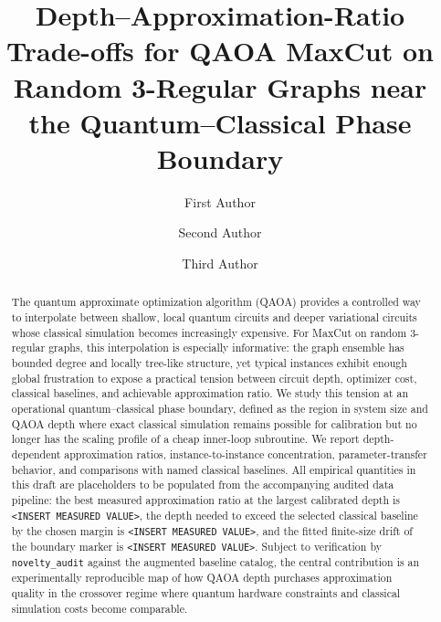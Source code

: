 \documentclass[reprint,aps,longbibliography]{revtex4-2}
\begin{document}
\title{Depth--Approximation-Ratio Trade-offs for QAOA MaxCut on Random 3-Regular Graphs near the Quantum--Classical Phase Boundary}

\author{First Author}

\author{Second Author}

\author{Third Author}

\maketitle

\begin{abstract}
The quantum approximate optimization algorithm (QAOA) provides a controlled way to interpolate between shallow, local quantum circuits and deeper variational circuits whose classical simulation becomes increasingly expensive. For MaxCut on random 3-regular graphs, this interpolation is especially informative: the graph ensemble has bounded degree and locally tree-like structure, yet typical instances exhibit enough global frustration to expose a practical tension between circuit depth, optimizer cost, classical baselines, and achievable approximation ratio. We study this tension at an operational quantum--classical phase boundary, defined as the region in system size and QAOA depth where exact classical simulation remains possible for calibration but no longer has the scaling profile of a cheap inner-loop subroutine. We report depth-dependent approximation ratios, instance-to-instance concentration, parameter-transfer behavior, and comparisons with named classical baselines. All empirical quantities in this draft are placeholders to be populated from the accompanying audited data pipeline: the best measured approximation ratio at the largest calibrated depth is \texttt{<INSERT MEASURED VALUE>}, the depth needed to exceed the selected classical baseline by the chosen margin is \texttt{<INSERT MEASURED VALUE>}, and the fitted finite-size drift of the boundary marker is \texttt{<INSERT MEASURED VALUE>}. Subject to verification by \texttt{novelty\_audit} against the augmented baseline catalog, the central contribution is an experimentally reproducible map of how QAOA depth purchases approximation quality in the crossover regime where quantum hardware constraints and classical simulation costs become comparable.
\end{abstract}
\end{document}
